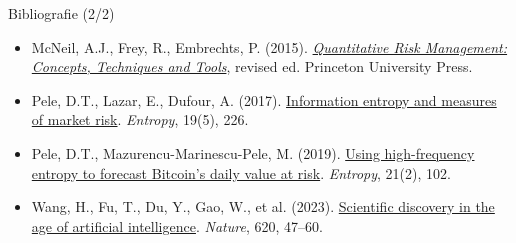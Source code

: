 \begin{frame}{Bibliografie (2/2)}
\begin{itemize}
    \item McNeil, A.J., Frey, R., Embrechts, P. (2015). \href{https://press.princeton.edu/books/hardcover/9780691166278/quantitative-risk-management}{\textit{Quantitative Risk Management: Concepts, Techniques and Tools}}, revised ed. Princeton University Press.
    \item Pele, D.T., Lazar, E., Dufour, A. (2017). \href{https://doi.org/10.3390/e19050226}{Information entropy and measures of market risk}. \textit{Entropy}, 19(5), 226.
    \item Pele, D.T., Mazurencu-Marinescu-Pele, M. (2019). \href{https://doi.org/10.3390/e21020102}{Using high-frequency entropy to forecast Bitcoin's daily value at risk}. \textit{Entropy}, 21(2), 102.
    \item Wang, H., Fu, T., Du, Y., Gao, W., et al. (2023). \href{https://doi.org/10.1038/s41586-023-06221-2}{Scientific discovery in the age of artificial intelligence}. \textit{Nature}, 620, 47--60.
\end{itemize}
\end{frame}


